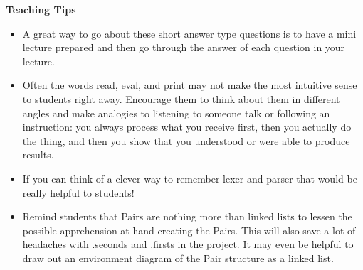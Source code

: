 \begin{blocksection}
\begin{guide}
\textbf{Teaching Tips}
\begin{itemize}
	\item A great way to go about these short answer type questions is to have a mini lecture prepared and then go through the answer of each question in your lecture.
	\item Often the words read, eval, and print may not make the most intuitive sense to students right away. Encourage them to think about them in different angles and make analogies to listening to someone talk or following an instruction: you always process what you receive first, then you actually do the thing, and then you show that you understood or were able to produce results.
	\item If you can think of a clever way to remember lexer and parser that would be really helpful to students!
	\item Remind students that Pairs are nothing more than linked lists to lessen the possible apprehension at hand-creating the Pairs. This will also save a lot of headaches with .seconds and .firsts in the project. It may even be helpful to draw out an environment diagram of the Pair structure as a linked list.
\end{itemize}
\end{guide}
\end{blocksection}
